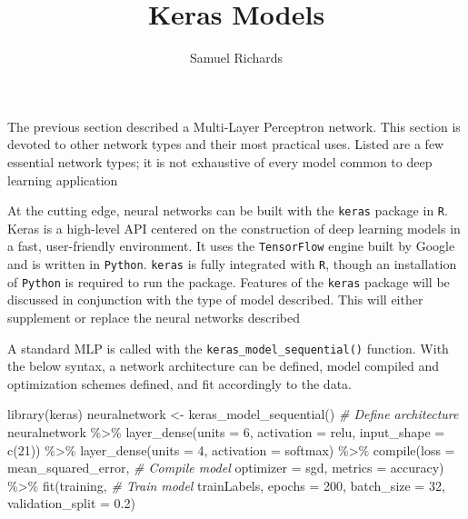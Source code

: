 \documentclass[
]{article}
\title{Keras Models}
\author{Samuel Richards}
\date{}
\newenvironment{Shaded}{\begin{snugshade}}{\end{snugshade}}
\newcommand{\AttributeTok}[1]{\textcolor[rgb]{0.77,0.63,0.00}{#1}}
\newcommand{\CommentTok}[1]{\textcolor[rgb]{0.56,0.35,0.01}{\textit{#1}}}
\newcommand{\DecValTok}[1]{\textcolor[rgb]{0.00,0.00,0.81}{#1}}
\newcommand{\FloatTok}[1]{\textcolor[rgb]{0.00,0.00,0.81}{#1}}
\newcommand{\FunctionTok}[1]{\textcolor[rgb]{0.00,0.00,0.00}{#1}}
\newcommand{\NormalTok}[1]{#1}
\newcommand{\OtherTok}[1]{\textcolor[rgb]{0.56,0.35,0.01}{#1}}
\newcommand{\SpecialCharTok}[1]{\textcolor[rgb]{0.00,0.00,0.00}{#1}}
\newcommand{\StringTok}[1]{\textcolor[rgb]{0.31,0.60,0.02}{#1}}
\begin{document}
\maketitle

The previous section described a Multi-Layer Perceptron network. This
section is devoted to other network types and their most practical uses.
Listed are a few essential network types; it is not exhaustive of every
model common to deep learning application

At the cutting edge, neural networks can be built with the
\texttt{keras} package in \texttt{R}. Keras is a high-level API centered
on the construction of deep learning models in a fast, user-friendly
environment. It uses the \texttt{TensorFlow} engine built by Google and
is written in \texttt{Python}. \texttt{keras} is fully integrated with
\texttt{R}, though an installation of \texttt{Python} is required to run
the package. Features of the \texttt{keras} package will be discussed in
conjunction with the type of model described. This will either
supplement or replace the neural networks described

A standard MLP is called with the \texttt{keras\_model\_sequential()}
function. With the below syntax, a network architecture can be defined,
model compiled and optimization schemes defined, and fit accordingly to
the data.

\begin{Shaded}
\begin{Highlighting}[]
\FunctionTok{library}\NormalTok{(keras)}
\NormalTok{neuralnetwork }\OtherTok{\textless{}{-}} \FunctionTok{keras\_model\_sequential}\NormalTok{()           }\CommentTok{\# Define architecture}
\NormalTok{      neuralnetwork }\SpecialCharTok{\%\textgreater{}\%}
      \FunctionTok{layer\_dense}\NormalTok{(}\AttributeTok{units =} \DecValTok{6}\NormalTok{, }\AttributeTok{activation =} \StringTok{\textquotesingle{}relu\textquotesingle{}}\NormalTok{, }\AttributeTok{input\_shape =} \FunctionTok{c}\NormalTok{(}\DecValTok{21}\NormalTok{)) }\SpecialCharTok{\%\textgreater{}\%}
      \FunctionTok{layer\_dense}\NormalTok{(}\AttributeTok{units =} \DecValTok{4}\NormalTok{, }\AttributeTok{activation =} \StringTok{\textquotesingle{}softmax\textquotesingle{}}\NormalTok{) }\SpecialCharTok{\%\textgreater{}\%} 
          \FunctionTok{compile}\NormalTok{(}\AttributeTok{loss =} \StringTok{\textquotesingle{}mean\_squared\_error\textquotesingle{}}\NormalTok{,      }\CommentTok{\# Compile model}
          \AttributeTok{optimizer =} \StringTok{\textquotesingle{}sgd\textquotesingle{}}\NormalTok{,}
          \AttributeTok{metrics =} \StringTok{\textquotesingle{}accuracy\textquotesingle{}}\NormalTok{) }\SpecialCharTok{\%\textgreater{}\%} 
              \FunctionTok{fit}\NormalTok{(training,                         }\CommentTok{\# Train model}
\NormalTok{              trainLabels,}
              \AttributeTok{epochs =} \DecValTok{200}\NormalTok{,}
              \AttributeTok{batch\_size =} \DecValTok{32}\NormalTok{,}
              \AttributeTok{validation\_split =} \FloatTok{0.2}\NormalTok{)}
\end{Highlighting}
\end{Shaded}
\end{document}
